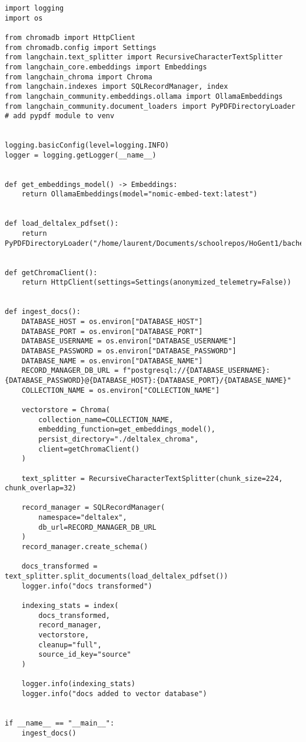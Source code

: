 \begin{lstlisting}
import logging
import os

from chromadb import HttpClient
from chromadb.config import Settings
from langchain.text_splitter import RecursiveCharacterTextSplitter
from langchain_core.embeddings import Embeddings
from langchain_chroma import Chroma
from langchain.indexes import SQLRecordManager, index
from langchain_community.embeddings.ollama import OllamaEmbeddings
from langchain_community.document_loaders import PyPDFDirectoryLoader
# add pypdf module to venv


logging.basicConfig(level=logging.INFO)
logger = logging.getLogger(__name__)


def get_embeddings_model() -> Embeddings:
    return OllamaEmbeddings(model="nomic-embed-text:latest")


def load_deltalex_pdfset():
    return PyPDFDirectoryLoader("/home/laurent/Documents/schoolrepos/HoGent1/bachelorsAssignment/deltalexDocs/").load()


def getChromaClient():
    return HttpClient(settings=Settings(anonymized_telemetry=False))


def ingest_docs():
    DATABASE_HOST = os.environ["DATABASE_HOST"]
    DATABASE_PORT = os.environ["DATABASE_PORT"]
    DATABASE_USERNAME = os.environ["DATABASE_USERNAME"]
    DATABASE_PASSWORD = os.environ["DATABASE_PASSWORD"]
    DATABASE_NAME = os.environ["DATABASE_NAME"]
    RECORD_MANAGER_DB_URL = f"postgresql://{DATABASE_USERNAME}:{DATABASE_PASSWORD}@{DATABASE_HOST}:{DATABASE_PORT}/{DATABASE_NAME}"
    COLLECTION_NAME = os.environ["COLLECTION_NAME"]

    vectorstore = Chroma(
        collection_name=COLLECTION_NAME,
        embedding_function=get_embeddings_model(),
        persist_directory="./deltalex_chroma",
        client=getChromaClient()
    )

    text_splitter = RecursiveCharacterTextSplitter(chunk_size=224, chunk_overlap=32)

    record_manager = SQLRecordManager(
        namespace="deltalex",
        db_url=RECORD_MANAGER_DB_URL
    )
    record_manager.create_schema()

    docs_transformed = text_splitter.split_documents(load_deltalex_pdfset())
    logger.info("docs transformed")

    indexing_stats = index(
        docs_transformed,
        record_manager,
        vectorstore,
        cleanup="full",
        source_id_key="source"
    )

    logger.info(indexing_stats)
    logger.info("docs added to vector database")


if __name__ == "__main__":
    ingest_docs()

\end{lstlisting}
